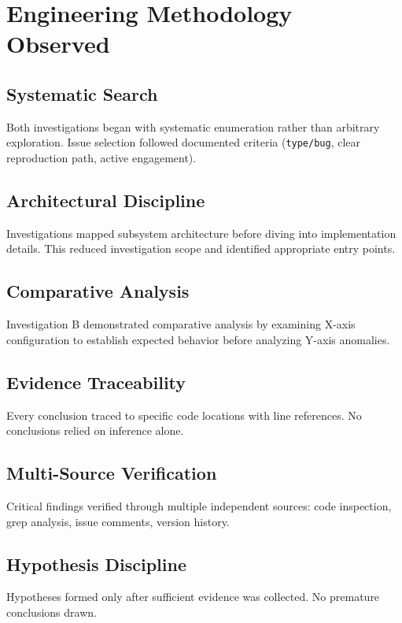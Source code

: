 \documentclass[
    11pt,
    a4paper,
    oneside,
    parskip=full,
    headings=big,
    bibliography=totoc
]{scrartcl}
\newcommand{\code}[1]{\texttt{#1}}
\begin{document}
\section{Engineering Methodology Observed}

\subsection*{Systematic Search}
Both investigations began with systematic enumeration rather than arbitrary 
exploration. Issue selection followed documented criteria (\code{type/bug}, 
clear reproduction path, active engagement).

\subsection*{Architectural Discipline}
Investigations mapped subsystem architecture before diving into implementation 
details. This reduced investigation scope and identified appropriate entry points.

\subsection*{Comparative Analysis}
Investigation B demonstrated comparative analysis by examining X-axis 
configuration to establish expected behavior before analyzing Y-axis anomalies.

\subsection*{Evidence Traceability}
Every conclusion traced to specific code locations with line references. 
No conclusions relied on inference alone.

\subsection*{Multi-Source Verification}
Critical findings verified through multiple independent sources: code inspection, 
grep analysis, issue comments, version history.

\subsection*{Hypothesis Discipline}
Hypotheses formed only after sufficient evidence was collected. 
No premature conclusions drawn.
\end{document}

